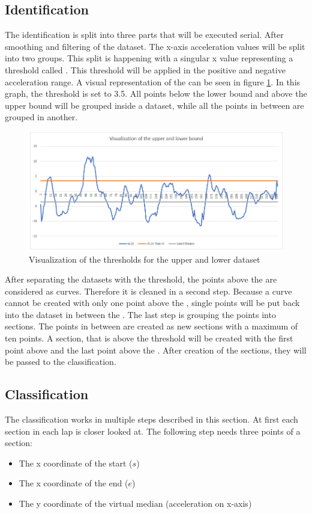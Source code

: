 \subsection{Identification}\label{identification}
The identification is split into three parts that will be executed serial. After smoothing and filtering of the dataset. The x-axis acceleration values will be split into two groups. This split is happening with a singular x value representing a threshold called . This threshold will be applied in the positive and negative acceleration range. A visual representation of the  can be seen in figure \ref{upperlowerBound}. In this graph, the threshold is set to 3.5. All points below the lower bound and above the upper bound will be grouped inside a dataset, while all the points in between are grouped in another.
\begin{figure}[H]
	\centering
	\includegraphics[scale= 0.6]{Pictures/upperandlowerbound.png}
	\caption{Visualization of the thresholds for the upper and lower dataset}
	\label{upperlowerBound}
\end{figure}
After separating the datasets with the threshold, the points above the  are considered as curves. Therefore it is cleaned in a second step. Because a curve cannot be created with only one point above the , single points will be put back into the dataset in between the . The last step is grouping the points into sections. The points in between are created as new sections with a maximum of ten points. A section, that is above the threshold will be created with the first point above and the last point above the . After creation of the sections, they will be passed to the classification.

\subsection{Classification}\label{classification}
The classification works in multiple steps described in this section. At first each section in each lap is closer looked at. The following step needs three points of a section:
\begin{itemize}
	\item The x coordinate of the start ($s$)
	\item The x coordinate of the end ($e$)
	\item The y coordinate of the virtual median (acceleration on x-axis)
\end{itemize}

